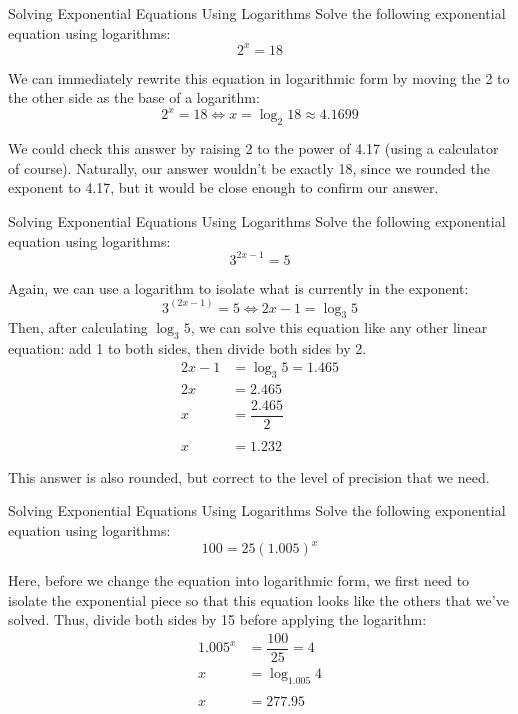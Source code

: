\begin{example}{Solving Exponential Equations Using Logarithms}
Solve the following exponential equation using logarithms:
\[2^x = 18\]

\sol
We can immediately rewrite this equation in logarithmic form by moving the 2 to the other side as the base of a logarithm:
\[2^x = 18 \iff x = \log_2 18 \approx \boxed{4.1699}\]

We could check this answer by raising 2 to the power of 4.17 (using a calculator of course).  Naturally, our answer wouldn't be exactly 18, since we rounded the exponent to 4.17, but it would be close enough to confirm our answer.
\end{example}
\pagebreak

\begin{example}{Solving Exponential Equations Using Logarithms}
Solve the following exponential equation using logarithms:
\[3^{2x-1} = 5\]

\sol
Again, we can use a logarithm to isolate what is currently in the exponent:
\[3^(2x-1) = 5 \iff 2x-1 = \log_3 5\]
Then, after calculating $\log_3 5$, we can solve this equation like any other linear equation: add 1 to both sides, then divide both sides by 2.
\begin{align*}
2x-1 &= \log_3 5 = 1.465\\
2x &= 2.465\\
x &= \dfrac{2.465}{2}\\ \\
x &= \boxed{1.232}
\end{align*}

This answer is also rounded, but correct to the level of precision that we need.
\end{example}

\begin{example}{Solving Exponential Equations Using Logarithms}
Solve the following exponential equation using logarithms:
\[100 = 25(1.005)^x\]

\sol
Here, before we change the equation into logarithmic form, we first need to isolate the exponential piece so that this equation looks like the others that we've solved.  Thus, divide both sides by 15 before applying the logarithm:
\begin{align*}
1.005^x &= \dfrac{100}{25} = 4\\
x &= \log_{1.005} 4\\ \\
x &= \boxed{277.95}
\end{align*}
\end{example}


